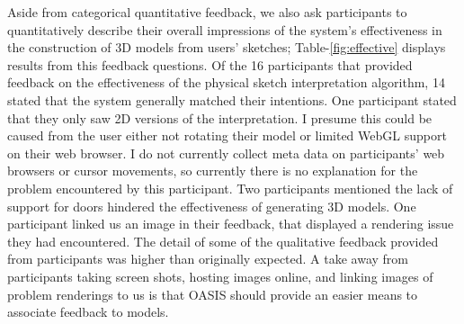 Aside from categorical quantitative feedback, we also ask participants to quantitatively describe their overall impressions of the system's effectiveness in the construction of 3D models from users' sketches; 
Table-\ref{fig:effective} displays results from this feedback questions.
Of the 16 participants that provided feedback on the effectiveness of the physical sketch interpretation algorithm, 14 stated that the system generally matched their intentions.
One participant stated that they only saw 2D versions of the interpretation.
I presume this could be caused from the user either not rotating their model or limited WebGL support on their web browser.
I do  not currently collect meta data on participants' web browsers or cursor movements, so currently there is no explanation for the problem encountered by this participant.
Two participants mentioned the lack of support for doors hindered the effectiveness of generating 3D models.
One participant linked us an image in their feedback, that displayed a rendering issue they had encountered.
The detail of some of the qualitative feedback provided from participants was higher than originally expected.
A take away from participants taking screen shots, hosting images online, and linking images of problem renderings to us is that OASIS should provide an easier means to associate feedback to models.

